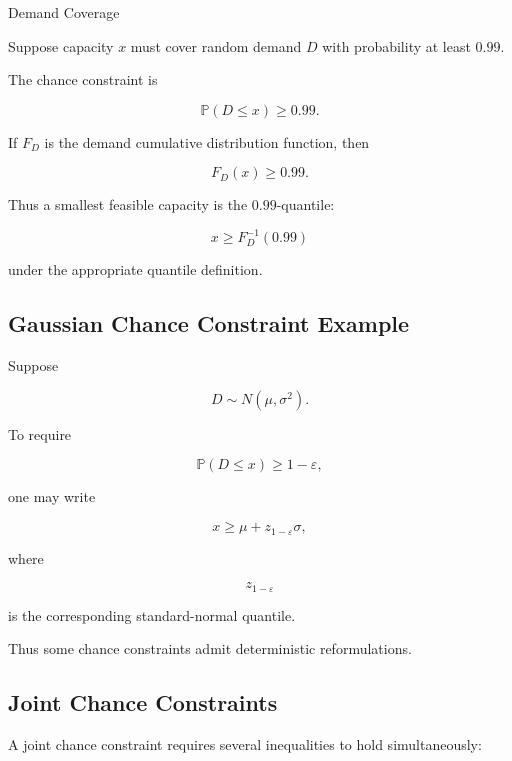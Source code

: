 \begin{workedexamplebox}{Demand Coverage}

Suppose capacity \(x\) must cover random demand \(D\) with probability at
least \(0.99\).

The chance constraint is

\[
\boxed{
\mathbb{P}
(
D\leq x
)
\geq
0.99.
}
\]

If \(F_D\) is the demand cumulative distribution function, then

\[
F_D(x)\geq0.99.
\]

Thus a smallest feasible capacity is the \(0.99\)-quantile:

\begin{answerbox}
\[
\boxed{
x
\geq
F_D^{-1}(0.99)
}
\]

under the appropriate quantile definition.
\end{answerbox}

\end{workedexamplebox}

\subsection{Gaussian Chance Constraint Example}
\label{subsec:gaussian-chance-constraint}

Suppose

\[
D
\sim
N(\mu,\sigma^2).
\]

To require

\[
\mathbb{P}(D\leq x)
\geq
1-\varepsilon,
\]

one may write

\[
\boxed{
x
\geq
\mu
+
z_{1-\varepsilon}\sigma,
}
\]

where

\[
z_{1-\varepsilon}
\]

is the corresponding standard-normal quantile.

Thus some chance constraints admit deterministic reformulations.

\subsection{Joint Chance Constraints}
\label{subsec:joint-chance-constraints}

A joint chance constraint requires several inequalities to hold
simultaneously:


